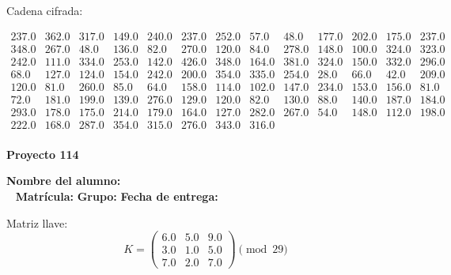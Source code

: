 \documentclass[12pt]{article}
\begin{document}
Cadena cifrada:
\begin{center}
$\begin{array}{lllllllllllll}
237.0 & 362.0 & 317.0 & 149.0 & 240.0 & 237.0 & 252.0 & 57.0 & 48.0 & 177.0 & 202.0 & 175.0 & 237.0\\
348.0 & 267.0 & 48.0 & 136.0 & 82.0 & 270.0 & 120.0 & 84.0 & 278.0 & 148.0 & 100.0 & 324.0 & 323.0\\
242.0 & 111.0 & 334.0 & 253.0 & 142.0 & 426.0 & 348.0 & 164.0 & 381.0 & 324.0 & 150.0 & 332.0 & 296.0\\
68.0 & 127.0 & 124.0 & 154.0 & 242.0 & 200.0 & 354.0 & 335.0 & 254.0 & 28.0 & 66.0 & 42.0 & 209.0\\
120.0 & 81.0 & 260.0 & 85.0 & 64.0 & 158.0 & 114.0 & 102.0 & 147.0 & 234.0 & 153.0 & 156.0 & 81.0\\
72.0 & 181.0 & 199.0 & 139.0 & 276.0 & 129.0 & 120.0 & 82.0 & 130.0 & 88.0 & 140.0 & 187.0 & 184.0\\
293.0 & 178.0 & 175.0 & 214.0 & 179.0 & 164.0 & 127.0 & 282.0 & 267.0 & 54.0 & 148.0 & 112.0 & 198.0\\
222.0 & 168.0 & 287.0 & 354.0 & 315.0 & 276.0 & 343.0 & 316.0\\
\end{array}$
\end{center}

\newpage


\textbf{Proyecto 114}

\textbf{Nombre del alumno:} \underline{\hspace{13cm}}\\\
\vspace{1cm}
\textbf{Matrícula:} \underline{\hspace{4cm}} \hspace{1cm}
\textbf{Grupo:} \underline{\hspace{2cm}}
\textbf{Fecha de entrega:} \underline{\hspace{2cm}}

\medskip

Matriz llave:
\[
K = \begin{pmatrix}
6.0 & 5.0 & 9.0\\
3.0 & 1.0 & 5.0\\
7.0 & 2.0 & 7.0
\end{pmatrix} \pmod{29}
\]
\end{document}
